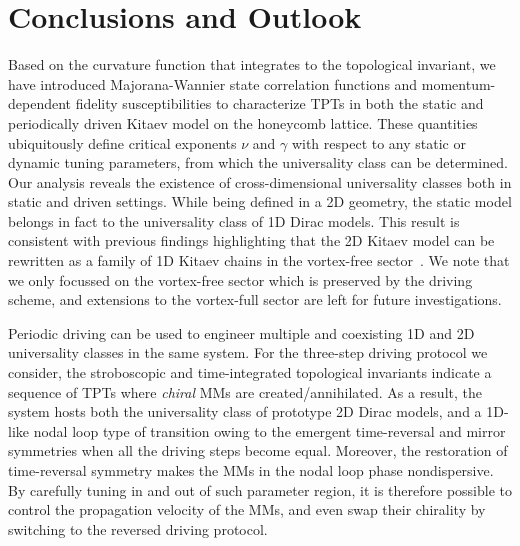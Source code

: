 \documentclass[aps,prb,twocolumn,superscriptaddress,groupedaddress]{revtex4}
\begin{document}
\section{Conclusions and Outlook}
\label{sec:outlook}

Based on the curvature function that integrates to the topological invariant, we have introduced Majorana-Wannier state correlation functions and momentum-dependent fidelity susceptibilities to characterize TPTs in both the static and periodically driven Kitaev model on the honeycomb lattice.
These quantities ubiquitously define critical exponents $\nu$ and $\gamma$ with respect to any static or dynamic tuning parameters, from which the universality class can be determined. 
Our analysis reveals the existence of cross-dimensional universality classes both in static and driven settings.
While being defined in a 2D geometry, the static model belongs in fact to the universality class of 1D Dirac models.
This result is consistent with previous findings highlighting that the 2D Kitaev model can be rewritten as a family of 1D Kitaev chains in the vortex-free sector~\cite{Thakurathi:2014}.
We note that we only focussed on the vortex-free sector which is preserved by the driving scheme, and extensions to the vortex-full sector are left for future investigations.

Periodic driving can be used to engineer multiple and coexisting 1D and 2D universality classes in the same system.
For the three-step driving protocol we consider, the stroboscopic and time-integrated topological invariants indicate a sequence of TPTs where \emph{chiral} MMs are created/annihilated. 
As a result, the system hosts both the universality class of prototype 2D Dirac models, and a 1D-like nodal loop type of transition owing to the emergent time-reversal and mirror symmetries when all the driving steps become equal.
Moreover, the restoration of time-reversal symmetry makes the MMs in the nodal loop phase nondispersive. 
By carefully tuning in and out of such parameter region, it is therefore possible to control the propagation velocity of the MMs, and even swap their chirality by switching to the reversed driving protocol.
\end{document}
